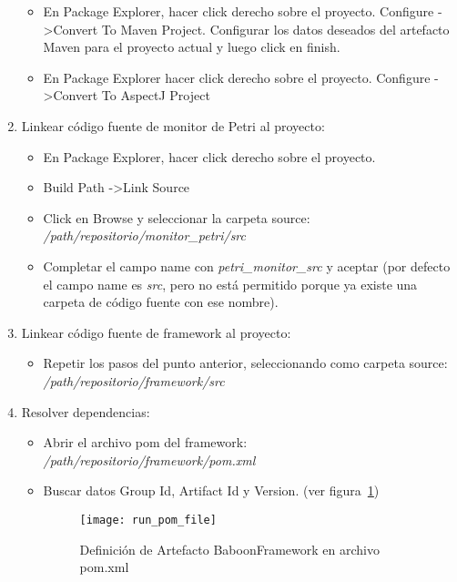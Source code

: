 \begin{enumerate}
\begin{itemize}
          \item En Package Explorer, hacer click derecho sobre el proyecto.
          Configure -\textgreater  Convert To Maven Project. Configurar los
          datos deseados del artefacto Maven para el proyecto actual y luego click en finish.
          \item En Package Explorer hacer click derecho sobre el proyecto.
          Configure -\textgreater  Convert To AspectJ Project
        \end{itemize}
   \item Linkear código fuente de monitor de Petri al proyecto:
        \begin{itemize}
          \item En Package Explorer, hacer click derecho sobre el proyecto.
          \item Build Path -\textgreater Link Source
          \item Click en Browse y seleccionar la carpeta source:               
          \emph{/path/repositorio/monitor\_petri/src}
          \item Completar el campo name con \emph{petri\_monitor\_src} y aceptar
          (por defecto el campo name es \emph{src}, pero no está
          permitido porque ya existe una carpeta de código fuente con ese nombre).
        \end{itemize}
   \item Linkear código fuente de framework al proyecto: 
        \begin{itemize}
          \item Repetir los pasos del punto anterior, seleccionando como carpeta
          source: \emph{/path/repositorio/framework/src}
        \end{itemize}
   \item Resolver dependencias:
        \begin{itemize}
          \item Abrir el archivo pom del framework:
                \emph{/path/repositorio/framework/pom.xml}
          \item Buscar datos Group Id, Artifact Id y Version. (ver
          figura~\ref{fig:run_pom_file}) 
            \begin{figure}[H]
                \centering
                \texttt{[image: run\_pom\_file]}
                \caption{Definición de Artefacto BaboonFramework en archivo
                pom.xml}
            \label{fig:run_pom_file}
                \end{figure}

\end{itemize}
\end{enumerate}
